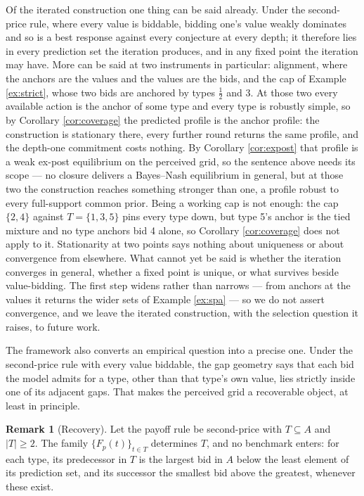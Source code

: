 \documentclass[12pt]{article}
\theoremstyle{definition}
\newtheorem{remark}{Remark}
\begin{document}
Of the iterated construction one thing can be said already. Under the second-price rule, where every value is biddable, bidding one's value weakly dominates and so is a best response against every conjecture at every depth; it therefore lies in every prediction set the iteration produces, and in any fixed point the iteration may have. More can be said at two instruments in particular: alignment, where the anchors are the values and the values are the bids, and the cap of Example \ref{ex:strict}, whose two bids are anchored by types $\tfrac12$ and $3$. At those two every available action is the anchor of some type and every type is robustly simple, so by Corollary \ref{cor:coverage} the predicted profile is the anchor profile: the construction is stationary there, every further round returns the same profile, and the depth-one commitment costs nothing. By Corollary \ref{cor:expost} that profile is a weak ex-post equilibrium on the perceived grid, so the sentence above needs its scope --- no closure delivers a Bayes--Nash equilibrium in general, but at those two the construction reaches something stronger than one, a profile robust to every full-support common prior. Being a working cap is not enough: the cap $\{2,4\}$ against $T = \{1,3,5\}$ pins every type down, but type 5's anchor is the tied mixture and no type anchors bid 4 alone, so Corollary \ref{cor:coverage} does not apply to it. Stationarity at two points says nothing about uniqueness or about convergence from elsewhere. What cannot yet be said is whether the iteration converges in general, whether a fixed point is unique, or what survives beside value-bidding. The first step widens rather than narrows --- from anchors at the values it returns the wider sets of Example \ref{ex:spa} --- so we do not assert convergence, and we leave the iterated construction, with the selection question it raises, to future work.

The framework also converts an empirical question into a precise one. Under the second-price rule with every value biddable, the gap geometry says that each bid the model admits for a type, other than that type's own value, lies strictly inside one of its adjacent gaps. That makes the perceived grid a recoverable object, at least in principle.

\begin{remark}[Recovery]\label{rem:recovery}
Let the payoff rule be second-price with $T \subseteq A$ and $|T| \ge 2$. The family $\{F_p(t)\}_{t \in T}$ determines $T$, and no benchmark enters: for each type, its predecessor in $T$ is the largest bid in $A$ below the least element of its prediction set, and its successor the smallest bid above the greatest, whenever these exist.
\end{remark}
\end{document}
